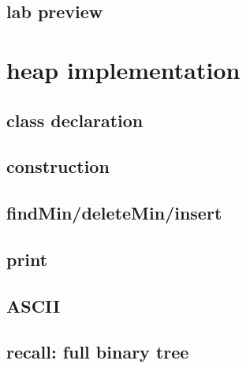 \subsection{lab preview}

\section{heap implementation}

\subsection{class declaration}

\subsection{construction}

\subsection{findMin/deleteMin/insert}

\subsection{print}



\subsection{ASCII}

\subsection{recall: full binary tree}


